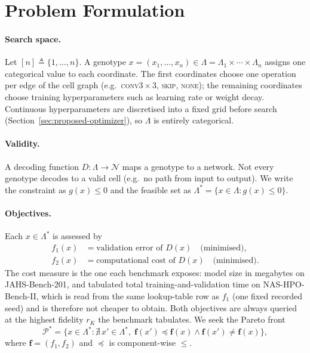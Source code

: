 \section{Problem Formulation}
\label{sec:problem-formulation}

\paragraph{Search space.} Let $[n] \triangleq \{1, \dots, n\}$. A genotype
$x = (x_1, \dots, x_n) \in \Lambda = \Lambda_1 \times \cdots \times \Lambda_n$ assigns one categorical value to
each coordinate. The first coordinates choose one operation per edge of the cell graph (e.g.\
\textsc{conv}$3{\times}3$, \textsc{skip}, \textsc{none}); the remaining coordinates choose training
hyperparameters such as learning rate or weight decay. Continuous hyperparameters are discretised into a fixed
grid before search (Section~\ref{sec:proposed-optimizer}), so $\Lambda$ is entirely categorical.

\paragraph{Validity.} A decoding function $D \colon \Lambda \to \mathcal{N}$ maps a genotype to a network. Not
every genotype decodes to a valid cell (e.g.\ no path from input to output). We write the constraint as
$g(x) \leq 0$ and the feasible set as $\Lambda^* = \{x \in \Lambda : g(x) \leq 0\}$.

\paragraph{Objectives.} Each $x \in \Lambda^*$ is assessed by
\begin{align}
    f_1(x) &= \text{validation error of } D(x) \quad \text{(minimised)}, \\
    f_2(x) &= \text{computational cost of } D(x) \quad \text{(minimised)}.
\end{align}
The cost measure is the one each benchmark exposes: model size in megabytes on JAHS-Bench-201, and tabulated
total training-and-validation time on NAS-HPO-Bench-II, which is read from the same lookup-table row as $f_1$
(one fixed recorded seed) and is therefore not cheaper to obtain. Both objectives are always queried at the highest fidelity $r_K$ the
benchmark tabulates. We seek the Pareto front
\[
    \mathcal{P}^* = \bigl\{ x \in \Lambda^* : \nexists\, x' \in \Lambda^*,\;
    \mathbf{f}(x') \preceq \mathbf{f}(x) \wedge \mathbf{f}(x') \neq \mathbf{f}(x) \bigr\},
\]
where $\mathbf{f} = (f_1, f_2)$ and $\preceq$ is component-wise $\leq$.

